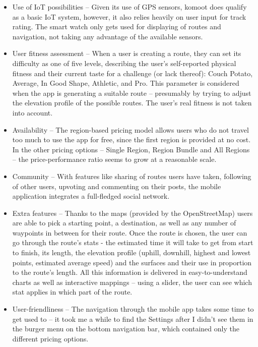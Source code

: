 \begin{itemize}
    \item Use of IoT possibilities -- Given its use of GPS sensors, komoot does qualify as a basic IoT system, however, it also relies heavily on user input for track rating.
    The smart watch only gets used for displaying of routes and navigation, not taking any advantage of the available sensors.
    \item User fitness assessment -- When a user is creating a route, they can set its difficulty as one of five levels, 
    describing the user's self-reported physical fitness and their current taste for a challenge (or lack thereof): Couch Potato, Average, In Good Shape, Athletic, and Pro.
    This parameter is considered when the app is generating a suitable route -- presumably by trying to adjust the elevation profile of the possible routes.
    The user's real fitness is not taken into account.
    \item Availability -- The region-based pricing model allows users who do not travel too much to use the app for free,
    since the first region is provided at no cost.
    In the other pricing options -- Single Region, Region Bundle and All Regions -- the price-performance ratio seems to grow at a reasonable scale.
    \item Community -- With features like sharing of routes users have taken, following of other users, upvoting and commenting on their posts, the mobile application integrates a full-fledged social network.
    \item Extra features -- Thanks to the maps (provided by the OpenStreetMap) users are able to pick a starting point, a destination, as well as any number of waypoints in between for their route.
    Once the route is chosen, the user can go through the route's stats - the estimated time it will take to get from start to finish, its length, the elevation profile (uphill, downhill, highest and lowest points, estimated average speed) and the surfaces and their use in proportion to the route's length.
    All this information is delivered in easy-to-understand charts as well as interactive mappings -- using a slider, the user can see which stat applies in which part of the route.
    \item User-friendliness -- The navigation through the mobile app takes some time to get used to -- it took me a while to find the Settings after I didn't see them in the burger menu on the bottom navigation bar, which contained only the different pricing options.

\end{itemize}
